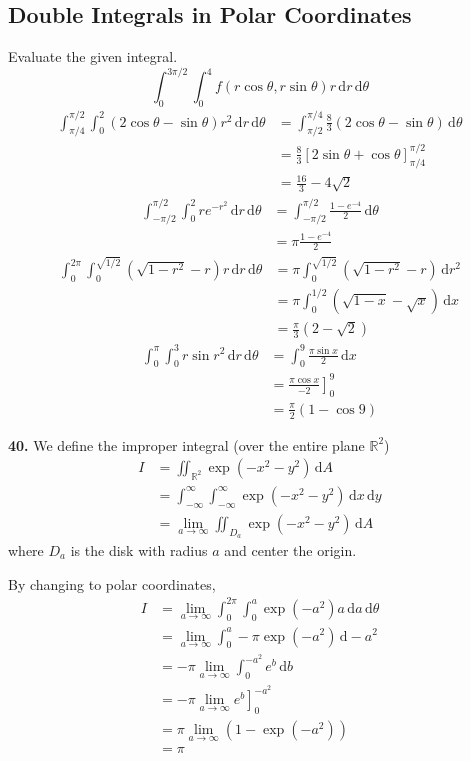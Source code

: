 \documentclass[a4paper,12pt]{article}
\newcommand{\ud}{\,\mathrm{d}}
\newcommand{\exercise}[1]{\noindent\textbf{#1.}}
\begin{document}
\subsection{Double Integrals in Polar Coordinates}
Evaluate the given integral.
\[\int_0^{3\pi/2}\int_0^4 f(r\cos\theta, r\sin\theta)r\ud r\ud\theta\tag{1}\]
\begin{align*}
  \int_{\pi/4}^{\pi/2}\int_0^2(2\cos\theta - \sin\theta)r^2\ud r\ud\theta
  &= \int_{\pi/2}^{\pi/4}\frac{8}{3}(2\cos\theta - \sin\theta)\ud\theta\\
  &= \frac{8}{3}\left[2\sin\theta + \cos\theta\right]_{\pi/4}^{\pi/2}\\
  &= \frac{16}{3} - 4\sqrt 2\tag{8}
\end{align*}
\begin{align*}
  \int_{-\pi/2}^{\pi/2}\int_0^2 re^{-r^2}\ud r\ud\theta
  &= \int_{-\pi/2}^{\pi/2}\frac{1 - e^{-4}}{2}\ud\theta\\
  &= \pi\frac{1 - e^{-4}}{2}\tag{11}
\end{align*}
\begin{align*}
  \int_0^{2\pi}\int_0^{\sqrt{1/2}}\left(\sqrt{1 - r^2} - r\right)r\ud r\ud\theta
  &= \pi\int_0^{\sqrt{1/2}}\left(\sqrt{1 - r^2} - r\right)\ud r^2\\
  &= \pi\int_0^{1/2}(\sqrt{1 - x} - \sqrt x)\ud x\\
  &= \frac{\pi}{3}(2 - \sqrt 2)\tag{25}
\end{align*}
\begin{align*}
  \int_0^\pi\int_0^3 r\sin r^2\ud r\ud\theta
  &= \int_0^9\frac{\pi\sin x}{2}\ud x\\
  &= \left.\frac{\pi\cos x}{-2}\right]_0^9\\
  &= \frac{\pi}{2}(1 - \cos 9)\tag{29}
\end{align*}

\exercise{40} We define the improper integral
(over the entire plane $\mathbb{R}^2$)
\begin{align*}
  I &= \iint_{\mathbb{R}^2}\exp(-x^2-y^2)\ud A\\
  &= \int_{-\infty}^\infty\int_{-\infty}^\infty\exp(-x^2-y^2)\ud x\ud y\\
  &= \lim_{a\to\infty}\iint_{D_a}\exp(-x^2-y^2)\ud A
\end{align*}
where $D_a$ is the disk with radius $a$ and center the origin.

By changing to polar coordinates,
\begin{align*}
  I &= \lim_{a\to\infty}\int_0^{2\pi}\int_0^a\exp(-a^2)a\ud a\ud\theta\\
  &= \lim_{a\to\infty}\int_0^a-\pi\exp(-a^2)\ud-a^2\\
  &= -\pi\lim_{a\to\infty}\int_0^{-a^2}e^b\ud b\\
  &= -\pi\lim_{a\to\infty}\left.e^b\right]_0^{-a^2}\\
  &= \pi\lim_{a\to\infty}(1 - \exp(-a^2))\\
  &= \pi\tag{a}
\end{align*}
\end{document}
